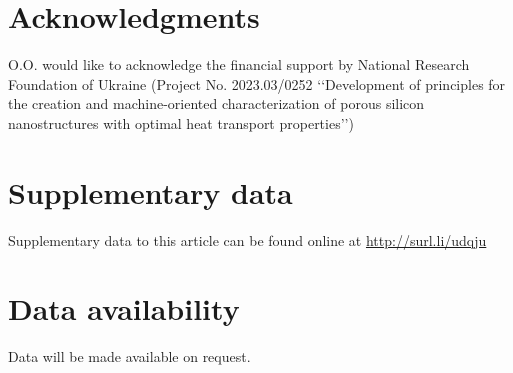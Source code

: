 \documentclass[a4paper,fleqn]{cas-sc}
\begin{document}

\section*{Acknowledgments}
O.O. would like to acknowledge the financial support by
National Research Foundation of Ukraine (Project No. 2023.03/0252
‘‘Development of principles for the creation and machine-oriented
characterization of porous silicon nanostructures with optimal
heat transport properties’’)

\section*{Supplementary data}\label{SuplData}
Supplementary data to this article can be found online at
\url{http://surl.li/udqju}


\section*{Data availability}
Data will be made available on request.


\printcredits



%



%
\end{document}
